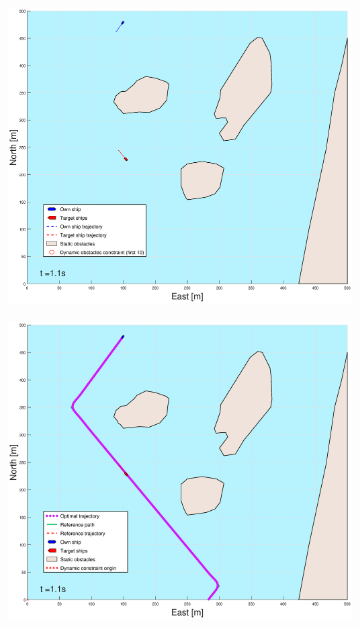 \clearpage
\begin{figure}[!b] %
    \begin{subfigure}[b]{0.49\textwidth}
        \centering
        \includegraphics[width=\textwidth]{Images/Figures/Helloya_Rev/_Simple_1fig1_time=1}
    \end{subfigure}
    \hfill
    \begin{subfigure}[b]{0.499\textwidth}
        \centering
        \includegraphics[width=\textwidth]{Images/Figures/Helloya_Rev/_Simple_1fig999_time=1}

\end{subfigure}
\end{figure}
